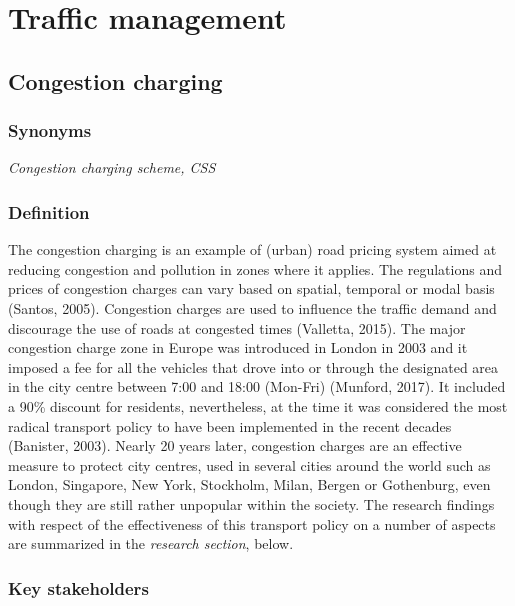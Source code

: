 \documentclass[
]{book}
\begin{document}
\hypertarget{traffic}{%
\chapter{Traffic management}\label{traffic}}

\hypertarget{congestion-charging}{%
\section{Congestion charging}\label{congestion-charging}}

\hypertarget{synonyms-4}{%
\subsection*{Synonyms}\label{synonyms-4}}

\emph{Congestion charging scheme, CSS}

\hypertarget{definition-4}{%
\subsection*{Definition}\label{definition-4}}

The congestion charging is an example of (urban) road pricing system aimed at reducing congestion and pollution in zones where it applies. The regulations and prices of congestion charges can vary based on spatial, temporal or modal basis (Santos, 2005). Congestion charges are used to influence the traffic demand and discourage the use of roads at congested times (Valletta, 2015). The major congestion charge zone in Europe was introduced in London in 2003 and it imposed a fee for all the vehicles that drove into or through the designated area in the city centre between 7:00 and 18:00 (Mon-Fri) (Munford, 2017). It included a 90\% discount for residents, nevertheless, at the time it was considered the most radical transport policy to have been implemented in the recent decades (Banister, 2003). Nearly 20 years later, congestion charges are an effective measure to protect city centres, used in several cities around the world such as London, Singapore, New York, Stockholm, Milan, Bergen or Gothenburg, even though they are still rather unpopular within the society. The research findings with respect of the effectiveness of this transport policy on a number of aspects are summarized in the \emph{research section}, below.

\hypertarget{key-stakeholders-4}{%
\subsection*{Key stakeholders}\label{key-stakeholders-4}}
\end{document}
